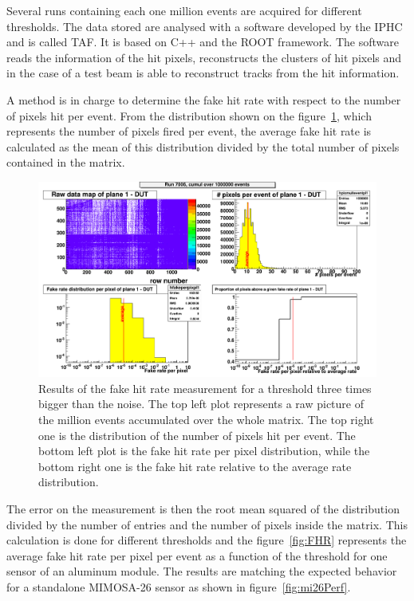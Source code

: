   Several runs containing each one million events are acquired for different thresholds. 
  The data stored are analysed with a software developed by the IPHC and is called \gls{TAF}\cite{TAF2015}.
  It is based on C++ and the ROOT framework.
  The software reads the information of the hit pixels, reconstructs the clusters of hit pixels and in the case of a test beam is able to reconstruct tracks from the hit information.

  A method is in charge to determine the fake hit rate with respect to the number of pixels hit per event.
  From the distribution shown on the figure~\ref{fig:pixel/event}, which represents the number of pixels fired per event, the average fake hit rate is calculated as the mean of this distribution divided by the total number of pixels contained in the matrix.
    \begin{figure}
    \centering
    \includegraphics[width = \textwidth]{Pictures/labTests/FHR_AS01_chip3.png}
    \caption{Results of the fake hit rate measurement for a threshold three times bigger than the noise. The top left plot represents a raw picture of the million events accumulated over the whole matrix. The top right one is the distribution of the number of pixels hit per event. The bottom left plot is the fake hit rate per pixel distribution, while the bottom right one is the fake hit rate relative to the average rate distribution.}
    \label{fig:pixel/event}
  \end{figure}
  The error on the measurement is then the root mean squared of the distribution divided by the number of entries and the number of pixels inside the matrix.
  This calculation is done for different thresholds and the figure~\ref{fig:FHR} represents the average fake hit rate per pixel per event as a function of the threshold for one sensor of an aluminum module.
  The results are matching the expected behavior for a standalone MIMOSA-26 sensor as shown in figure~\ref{fig:mi26Perf}.

